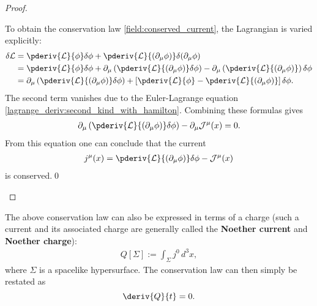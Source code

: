 \begin{theorem}
\begin{proof}
\begin{mdframed}[roundcorner=10pt, linecolor=blue, linewidth=1pt]
                To obtain the conservation law \eqref{field:conserved_current}, the Lagrangian is varied explicitly:
                \begin{align*}
                    \delta\mathcal{L} &= \pderiv{\mathcal{L}}{\phi}\delta\phi + \pderiv{\mathcal{L}}{(\partial_\mu\phi)}\delta(\partial_\mu\phi)\\
                    &= \pderiv{\mathcal{L}}{\phi}\delta\phi + \partial_\mu\left(\pderiv{\mathcal{L}}{(\partial_\mu\phi)}\delta\phi\right) - \partial_\mu\left(\pderiv{\mathcal{L}}{(\partial_\mu\phi)}\right)\delta\phi\\
                    &= \partial_\mu\left(\pderiv{\mathcal{L}}{(\partial_\mu\phi)}\delta\phi\right) + \left[\pderiv{\mathcal{L}}{\phi} - \pderiv{\mathcal{L}}{(\partial_\mu\phi)}\right]\delta\phi.
                \end{align*}
                The second term vanishes due to the Euler-Lagrange equation \eqref{lagrange_deriv:second_kind_with_hamilton}. Combining these formulas gives
                \begin{gather}
                    \partial_\mu\left(\pderiv{\mathcal{L}}{(\partial_\mu\phi)}\delta\phi\right) - \partial_\mu\mathcal{J}^\mu(x) = 0.
                \end{gather}
                From this equation one can conclude that the current
                \begin{gather}
                    j^\mu(x) = \pderiv{\mathcal{L}}{(\partial_\mu\phi)}\delta\phi - \mathcal{J}^\mu(x)
                \end{gather}
                is conserved.\qed
            \end{mdframed}
        \end{proof}
    \end{theorem}
    The above conservation law can also be expressed in terms of a charge (such a current and its associated charge are generally called the \textbf{Noether current} and \textbf{Noether charge}):
    \begin{gather}
        \label{field:noether_charge}
        Q[\Sigma] := \int_\Sigma j^0\,d^3x,
    \end{gather}
    where $\Sigma$ is a spacelike hypersurface. The conservation law can then simply be restated as \[\deriv{Q}{t} = 0.\]

